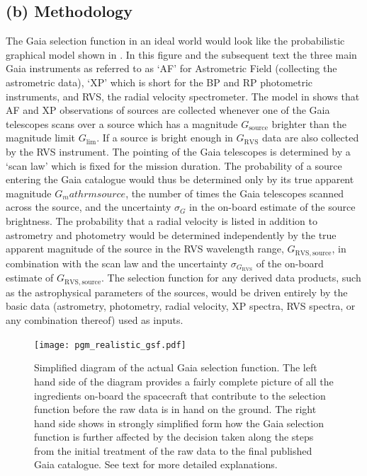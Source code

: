 \subsection{(b) Methodology}
\label{sec:methods}

The Gaia selection function in an ideal world would look like the probabilistic graphical model shown in . In this figure and the subsequent text the three main Gaia instruments as referred to as `AF' for Astrometric Field (collecting the astrometric data), `XP' which is short for the BP and RP photometric instruments, and RVS, the radial velocity spectrometer. The model in  shows that AF and XP observations of sources are collected whenever one of the Gaia telescopes scans over a source which has a magnitude $G_\mathrm{source}$ brighter than the magnitude limit $G_\mathrm{lim}$. If a source is bright enough in $G_\mathrm{RVS}$ data are also collected by the RVS instrument. The pointing of the Gaia telescopes is determined by a `scan law' which is fixed for the mission duration. The probability of a source entering the Gaia catalogue would thus be determined only by its true apparent magnitude $G_mathrm{source}$, the number of times the Gaia telescopes scanned across the source, and the uncertainty $\sigma_G$ in the on-board estimate of the source brightness. The probability that a radial velocity is listed in addition to astrometry and photometry would be determined independently by the true apparent magnitude of the source in the RVS wavelength range, $G_\mathrm{RVS,source}$, in combination with the scan law and the uncertainty $\sigma_{G_\mathrm{RVS}}$ of the on-board estimate of $G_\mathrm{RVS,source}$. The selection function for any derived data products, such as the astrophysical parameters of the sources, would be driven entirely by the basic data (astrometry, photometry, radial velocity, XP spectra, RVS spectra, or any combination thereof) used as inputs.

\begin{figure}[t]
    \centering
    \texttt{[image: pgm\_realistic\_gsf.pdf]}
    \caption{Simplified diagram of the actual Gaia selection function. The left hand side of the diagram provides a fairly complete picture of all the ingredients on-board the spacecraft that contribute to the selection function before the raw data is in hand on the ground. The right hand side shows in strongly simplified form how the Gaia selection function is further affected by the decision taken along the steps from the initial treatment of the raw data to the final published Gaia catalogue. See text for more detailed explanations.}
    \label{fig:gsf_realistic}
\end{figure}

